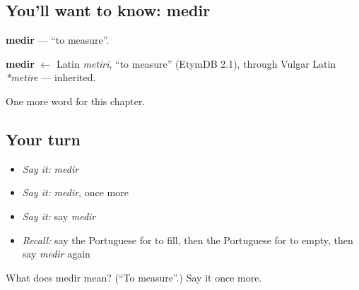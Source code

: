 \subsection*{You'll want to know: medir}
\textbf{medir} — \textquotedblleft{}to measure\textquotedblright{}.

\begin{cousinweb}
\textbf{medir} $\leftarrow$ Latin \emph{metiri}, \textquotedblleft{}to measure\textquotedblright{} (EtymDB 2.1), through Vulgar Latin \emph{*metire} — inherited.
\end{cousinweb}

\begin{grammarlens}[title={What you've built}]
One more word for this chapter.
\end{grammarlens}

\subsection*{Your turn}
\begin{itemize}
\raggedright
  \item \emph{Say it:} \emph{medir}
  \item \emph{Say it:} \emph{medir}, once more
  \item \emph{Say it:} say \emph{medir}
  \item \emph{Recall:} say the Portuguese for to fill, then the Portuguese for to empty, then say \emph{medir} again
\end{itemize}

\begin{tcolorbox}[breakable,colback=teal!4,colframe=teal!35!black,title={Before you move on}]
What does medir mean? (\textquotedblleft{}To measure\textquotedblright{}.) Say it once more.
\end{tcolorbox}
